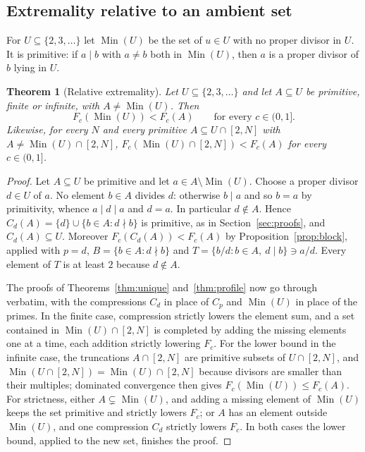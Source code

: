 \documentclass[11pt]{article}
\newtheorem{theorem}{Theorem}[section]
\theoremstyle{remark}
\begin{document}
\subsection{Extremality relative to an ambient set}

For $U\subseteq\{2,3,\dots\}$ let $\operatorname{Min}(U)$ be the set of
$u\in U$ with no proper divisor in $U$. It is primitive: if $a\mid b$
with $a\ne b$ both in $\operatorname{Min}(U)$, then $a$ is a proper
divisor of $b$ lying in $U$.

\begin{theorem}[Relative extremality]\label{thm:ambient}
Let $U\subseteq\{2,3,\dots\}$ and let $A\subseteq U$ be primitive, finite
or infinite, with $A\ne\operatorname{Min}(U)$. Then
\[
  F_c(\operatorname{Min}(U))<F_c(A)\qquad\text{for every }c\in(0,1].
\]
Likewise, for every $N$ and every primitive $A\subseteq U\cap[2,N]$ with
$A\ne\operatorname{Min}(U)\cap[2,N]$,
$F_c(\operatorname{Min}(U)\cap[2,N])<F_c(A)$ for every $c\in(0,1]$.
\end{theorem}

\begin{proof}
Let $A\subseteq U$ be primitive and let $a\in A\setminus\operatorname{Min}(U)$.
Choose a proper divisor $d\in U$ of $a$. No element $b\in A$ divides $d$:
otherwise $b\mid a$ and so $b=a$ by primitivity, whence $a\mid d\mid a$
and $d=a$. In particular $d\notin A$. Hence
$C_d(A)=\{d\}\cup\{b\in A:d\nmid b\}$ is primitive, as in
Section~\ref{sec:proofs}, and $C_d(A)\subseteq U$. Moreover
$F_c(C_d(A))<F_c(A)$ by Proposition~\ref{prop:block}, applied with $p=d$,
$B=\{b\in A:d\nmid b\}$ and $T=\{b/d:b\in A,\ d\mid b\}\ni a/d$.
Every element of $T$ is at least $2$ because $d\notin A$.

The proofs of Theorems~\ref{thm:unique} and~\ref{thm:profile} now go
through verbatim, with the compressions $C_d$ in place of $C_p$ and
$\operatorname{Min}(U)$ in place of the primes. In the finite case,
compression strictly lowers the element sum, and a set contained in
$\operatorname{Min}(U)\cap[2,N]$ is completed by adding the missing
elements one at a time, each addition strictly lowering $F_c$. For the
lower bound in the infinite case, the truncations $A\cap[2,N]$ are
primitive subsets of $U\cap[2,N]$, and
$\operatorname{Min}(U\cap[2,N])=\operatorname{Min}(U)\cap[2,N]$ because
divisors are smaller than their multiples; dominated convergence then
gives $F_c(\operatorname{Min}(U))\le F_c(A)$. For strictness, either
$A\subsetneq\operatorname{Min}(U)$, and adding a missing element of
$\operatorname{Min}(U)$ keeps the set primitive and strictly lowers
$F_c$; or $A$ has an element outside $\operatorname{Min}(U)$, and one
compression $C_d$ strictly lowers $F_c$. In both cases the lower bound,
applied to the new set, finishes the proof.
\end{proof}
\end{document}
